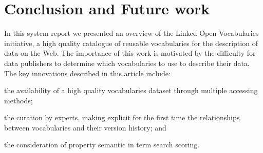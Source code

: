 \documentclass{iosart2c}
\begin{document}


		
%							
%   


\section{Conclusion and Future work}
\label{sec:conclusion}
In this system report we presented an overview of the Linked Open Vocabularies initiative, a high quality catalogue of reusable vocabularies for the description of data on the Web. The importance of this work is motivated by the difficulty for data publishers to determine which vocabularies to use to describe their data. The key innovations described in this article include: 
\begin{inparaenum}[1)] 
	\item the availability of a high quality vocabularies dataset through multiple accessing methods;
	\item the curation by experts, making explicit for the first time the relationships between vocabularies and their version history; and
	\item the consideration of property semantic in term search scoring.
\end{inparaenum}
\end{document}
